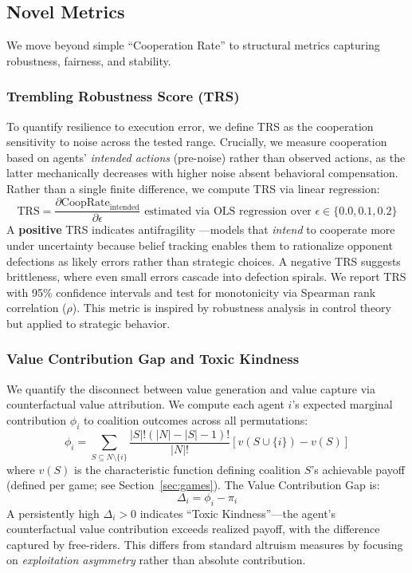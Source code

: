 \documentclass{uai2026} %
\begin{document}
\subsection{Novel Metrics}

We move beyond simple ``Cooperation Rate'' to structural metrics capturing robustness, fairness, and stability.

\subsubsection{Trembling Robustness Score (TRS)}

To quantify resilience to execution error, we define TRS as the cooperation sensitivity to noise across the tested range. Crucially, we measure cooperation based on agents' \textit{intended actions} (pre-noise) rather than observed actions, as the latter mechanically decreases with higher noise absent behavioral compensation. Rather than a single finite difference, we compute TRS via linear regression:
\begin{equation}
    \text{TRS} = \frac{\partial \text{CoopRate}_{\text{intended}}}{\partial \epsilon} \text{ estimated via OLS regression over } \epsilon \in \{0.0, 0.1, 0.2\}
\end{equation}
A \textbf{positive} TRS indicates antifragility \citep{camerer2003behavioral}---models that \textit{intend} to cooperate more under uncertainty because belief tracking enables them to rationalize opponent defections as likely errors rather than strategic choices. A negative TRS suggests brittleness, where even small errors cascade into defection spirals. We report TRS with 95\% confidence intervals and test for monotonicity via Spearman rank correlation ($\rho$). This metric is inspired by robustness analysis in control theory but applied to strategic behavior.

\subsubsection{Value Contribution Gap and Toxic Kindness}

We quantify the disconnect between value generation and value capture via counterfactual value attribution. We compute each agent $i$'s expected marginal contribution $\phi_i$ to coalition outcomes across all permutations:
\begin{equation}
    \phi_i = \sum_{S \subseteq N \setminus \{i\}} \frac{|S|!(|N|-|S|-1)!}{|N|!} [v(S \cup \{i\}) - v(S)]
\end{equation}
where $v(S)$ is the characteristic function defining coalition $S$'s achievable payoff (defined per game; see Section~\ref{sec:games}). The Value Contribution Gap is:
\begin{equation}
    \Delta_i = \phi_i - \pi_i
\end{equation}
A persistently high $\Delta_i > 0$ indicates ``Toxic Kindness''---the agent's counterfactual value contribution exceeds realized payoff, with the difference captured by free-riders. This differs from standard altruism measures by focusing on \textit{exploitation asymmetry} rather than absolute contribution.
\end{document}
